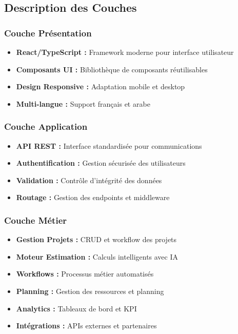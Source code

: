 \subsection{Description des Couches}

\subsubsection{Couche Présentation}
\begin{itemize}
    \item \textbf{React/TypeScript :} Framework moderne pour interface utilisateur
    \item \textbf{Composants UI :} Bibliothèque de composants réutilisables
    \item \textbf{Design Responsive :} Adaptation mobile et desktop
    \item \textbf{Multi-langue :} Support français et arabe
\end{itemize}

\subsubsection{Couche Application}
\begin{itemize}
    \item \textbf{API REST :} Interface standardisée pour communications
    \item \textbf{Authentification :} Gestion sécurisée des utilisateurs
    \item \textbf{Validation :} Contrôle d'intégrité des données
    \item \textbf{Routage :} Gestion des endpoints et middleware
\end{itemize}

\subsubsection{Couche Métier}
\begin{itemize}
    \item \textbf{Gestion Projets :} CRUD et workflow des projets
    \item \textbf{Moteur Estimation :} Calculs intelligents avec IA
    \item \textbf{Workflows :} Processus métier automatisés
    \item \textbf{Planning :} Gestion des ressources et planning
    \item \textbf{Analytics :} Tableaux de bord et KPI
    \item \textbf{Intégrations :} APIs externes et partenaires
\end{itemize}

